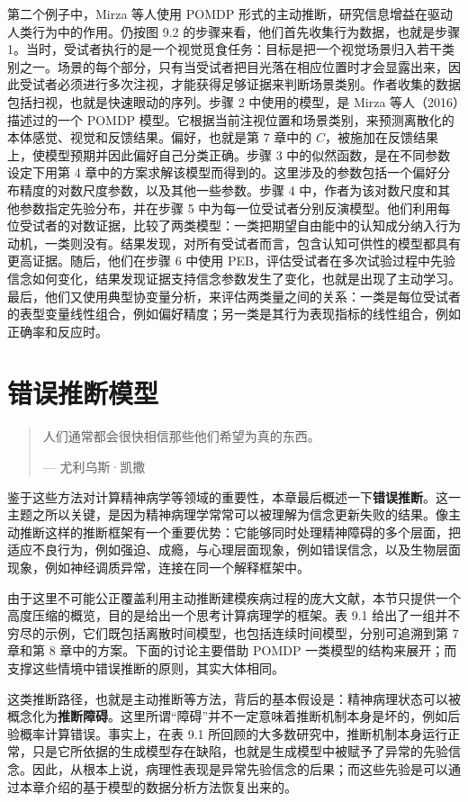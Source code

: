 第二个例子中，Mirza 等人使用 POMDP 形式的主动推断，研究信息增益在驱动人类行为中的作用。仍按图 9.2 的步骤来看，他们首先收集行为数据，也就是步骤 1。当时，受试者执行的是一个视觉觅食任务：目标是把一个视觉场景归入若干类别之一。场景的每个部分，只有当受试者把目光落在相应位置时才会显露出来，因此受试者必须进行多次注视，才能获得足够证据来判断场景类别。作者收集的数据包括扫视，也就是快速眼动的序列。步骤 2 中使用的模型，是 Mirza 等人（2016）描述过的一个 POMDP 模型。它根据当前注视位置和场景类别，来预测离散化的本体感觉、视觉和反馈结果。偏好，也就是第 7 章中的 $C$，被施加在反馈结果上，使模型预期并因此偏好自己分类正确。步骤 3 中的似然函数，是在不同参数设定下用第 4 章中的方案求解该模型而得到的。这里涉及的参数包括一个偏好分布精度的对数尺度参数，以及其他一些参数。步骤 4 中，作者为该对数尺度和其他参数指定先验分布，并在步骤 5 中为每一位受试者分别反演模型。他们利用每位受试者的对数证据，比较了两类模型：一类把期望自由能中的认知成分纳入行为动机，一类则没有。结果发现，对所有受试者而言，包含认知可供性的模型都具有更高证据。随后，他们在步骤 6 中使用 PEB，评估受试者在多次试验过程中先验信念如何变化，结果发现证据支持信念参数发生了变化，也就是出现了主动学习。最后，他们又使用典型协变量分析，来评估两类量之间的关系：一类是每位受试者的表型变量线性组合，例如偏好精度；另一类是其行为表现指标的线性组合，例如正确率和反应时。

\section{错误推断模型}

\begin{quote}
人们通常都会很快相信那些他们希望为真的东西。

--- 尤利乌斯·凯撒
\end{quote}

鉴于这些方法对计算精神病学等领域的重要性，本章最后概述一下\textbf{错误推断}。这一主题之所以关键，是因为精神病理学常常可以被理解为信念更新失败的结果。像主动推断这样的推断框架有一个重要优势：它能够同时处理精神障碍的多个层面，把适应不良行为，例如强迫、成瘾，与心理层面现象，例如错误信念，以及生物层面现象，例如神经调质异常，连接在同一个解释框架中。

由于这里不可能公正覆盖利用主动推断建模疾病过程的庞大文献，本节只提供一个高度压缩的概览，目的是给出一个思考计算病理学的框架。表 9.1 给出了一组并不穷尽的示例，它们既包括离散时间模型，也包括连续时间模型，分别可追溯到第 7 章和第 8 章中的方案。下面的讨论主要借助 POMDP 一类模型的结构来展开；而支撑这些情境中错误推断的原则，其实大体相同。

这类推断路径，也就是主动推断等方法，背后的基本假设是：精神病理状态可以被概念化为\textbf{推断障碍}。这里所谓“障碍”并不一定意味着推断机制本身是坏的，例如后验概率计算错误。事实上，在表 9.1 所回顾的大多数研究中，推断机制本身运行正常，只是它所依据的生成模型存在缺陷，也就是生成模型中被赋予了异常的先验信念。因此，从根本上说，病理性表现是异常先验信念的后果；而这些先验是可以通过本章介绍的基于模型的数据分析方法恢复出来的。

